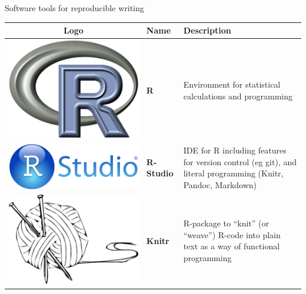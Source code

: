\documentclass[final,hyperref={pdfpagelabels=false}]{beamer}
\begin{document}
\begin{frame}{}
\begin{columns}[t]
\begin{column}{.48\linewidth}
\begin{block}{Software tools for reproducible writing}
\begin{tabulary}{1.0\textwidth}{CLL}
  \hline
 Logo  & Name & Description  \\ 
 \hline
\includegraphics[valign=T,scale=.2]{logo/R_logo} & \textbf{R }& Environment for statistical calculations and programming \cite{RCoreTeam2015}\\
 \includegraphics[valign=T,scale=.08]{logo/RStudio_logo} &  \textbf{R-Studio} & IDE for R including features for version control (eg git), and literal programming (Knitr, Pandoc, Markdown)\\
 \includegraphics[valign=T, scale=.5]{logo/knitr_logo} &  \textbf{Knitr} & R-package to ``knit'' (or ``weave'') R-code into plain text as a way of functional programming \cite{Xie2016}\\

\end{tabulary}
\end{block}
\end{column}
\end{columns}
\end{frame}
\end{document}

